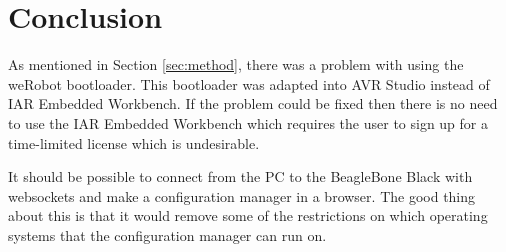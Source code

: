 \section{Conclusion}\label{sec:conclusion}
As mentioned in Section \ref{sec:method}, there was a problem with using the weRobot bootloader. This bootloader was adapted into AVR Studio instead of IAR Embedded Workbench. If the problem could be fixed then there is no need to use the IAR Embedded Workbench which requires the user to sign up for a time-limited license which is undesirable.

It should be possible to connect from the PC to the BeagleBone Black with websockets and make a configuration manager in a browser. The good thing about this is that it would remove some of the restrictions on which operating systems that the configuration manager can run on. 



